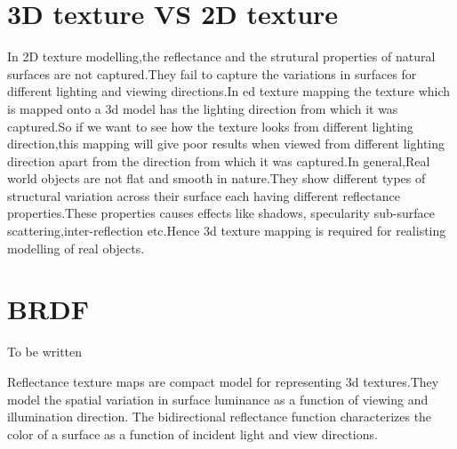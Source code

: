 \section{3D texture VS 2D texture}

In 2D texture modelling,the reflectance and the strutural properties of natural surfaces
are not captured.They fail to capture the variations in surfaces for different lighting and
viewing directions.In ed texture mapping the texture which is mapped onto a 3d model has
the lighting direction from which it was captured.So if we want to see how the texture looks from
different lighting direction,this mapping will give poor results when viewed from different
lighting direction apart from the direction from which it was captured.In general,Real world objects
are not flat and smooth in nature.They show different types of structural variation across their
surface each having different reflectance properties.These properties causes effects like shadows,
specularity sub-surface scattering,inter-reflection etc.Hence 3d texture mapping
is required for realisting modelling of real objects.

\section{BRDF}
To be written

Reflectance texture maps are compact model for representing 3d textures.They model the spatial
variation in surface luminance as a function of viewing and illumination direction.
The bidirectional reflectance function \cite{C3} characterizes the color of a surface as a function
of incident light and view directions.


